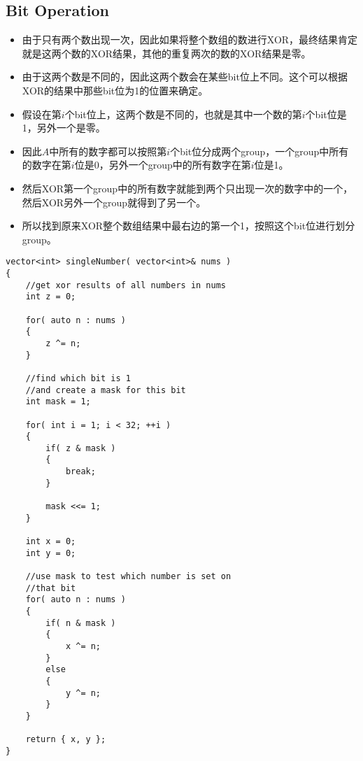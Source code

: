 \subsection{Bit Operation}
\begin{itemize}
\item 由于只有两个数出现一次，因此如果将整个数组的数进行XOR，最终结果肯定就是这两个数的XOR结果，其他的重复两次的数的XOR结果是零。
\item 由于这两个数是不同的，因此这两个数会在某些bit位上不同。这个可以根据XOR的结果中那些bit位为1的位置来确定。
\item 假设在第$i$个bit位上，这两个数是不同的，也就是其中一个数的第$i$个bit位是1，另外一个是零。
\item 因此$A$中所有的数字都可以按照第$i$个bit位分成两个group，一个group中所有的数字在第$i$位是0，另外一个group中的所有数字在第$i$位是1。
\item 然后XOR第一个group中的所有数字就能到两个只出现一次的数字中的一个，然后XOR另外一个group就得到了另一个。
\item 所以找到原来XOR整个数组结果中最右边的第一个1，按照这个bit位进行划分group。\setcounter{lstlisting}{0}
\end{itemize}
\begin{lstlisting}[style=customc, caption={XOR}]
vector<int> singleNumber( vector<int>& nums )
{
    //get xor results of all numbers in nums
    int z = 0;

    for( auto n : nums )
    {
        z ^= n;
    }

    //find which bit is 1
    //and create a mask for this bit
    int mask = 1;

    for( int i = 1; i < 32; ++i )
    {
        if( z & mask )
        {
            break;
        }

        mask <<= 1;
    }

    int x = 0;
    int y = 0;

    //use mask to test which number is set on
    //that bit
    for( auto n : nums )
    {
        if( n & mask )
        {
            x ^= n;
        }
        else
        {
            y ^= n;
        }
    }

    return { x, y };
}
\end{lstlisting}


